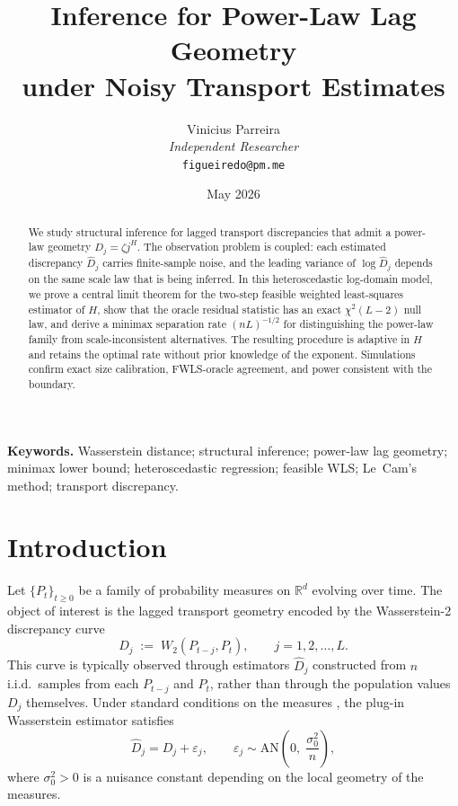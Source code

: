 \documentclass[10pt,a4paper,twocolumn]{article}
\title{\textbf{Inference for Power-Law Lag Geometry\\
under Noisy Transport Estimates}\\[0.5em]
}
\author{%
  Vinicius Parreira\hspace{0.18em}\orcidlink{0009-0005-0201-9308}\\[2pt]
  \small\textit{Independent Researcher}\\
  \small\texttt{figueiredo@pm.me}
}
\date{May 2026}
\newcommand{\R}{\mathbb{R}}
\newcommand{\Dhj}{\widehat{D}_j}
\begin{document}
\raggedbottom
\maketitle
\thispagestyle{empty}

\begin{abstract}
We study structural inference for lagged transport discrepancies that admit a
power-law geometry $D_j = \zeta j^H$.  The observation problem is coupled:
each estimated discrepancy $\Dhj$ carries finite-sample noise, and the
leading variance of $\log \Dhj$ depends on the same scale law that is being
inferred.  In this heteroscedastic log-domain model, we prove a central limit
theorem for the two-step feasible weighted least-squares estimator of $H$,
show that the oracle residual statistic has an exact $\chi^2(L-2)$ null law,
and derive a minimax separation rate $(nL)^{-1/2}$ for distinguishing the
power-law family from scale-inconsistent alternatives.  The resulting
procedure is adaptive in $H$ and retains the optimal rate without prior
knowledge of the exponent.  Simulations confirm exact size calibration,
FWLS-oracle agreement, and power consistent with the boundary.
\end{abstract}

\bigskip\noindent
\textbf{Keywords.} Wasserstein distance; structural inference; power-law lag
geometry; minimax lower bound; heteroscedastic regression; feasible WLS;
Le~Cam's method; transport discrepancy.

\section{Introduction}
\label{sec:intro}

Let $\{P_t\}_{t \geq 0}$ be a family of probability measures on
$\R^d$ evolving over time.  The object of interest is the lagged transport
geometry encoded by the Wasserstein-2 discrepancy curve
\[
    D_j \;:=\; W_2(P_{t-j}, P_t),\qquad j = 1, 2, \ldots, L.
\]
This curve is typically observed through estimators $\Dhj$ constructed from
$n$ i.i.d.\ samples from each $P_{t-j}$ and $P_t$, rather than through the
population values $D_j$ themselves.  Under standard conditions on the measures
\citep{FournierGuillin2015,GoldfeldEtAl2022,delBarrioEtAl2023}, the plug-in Wasserstein estimator
satisfies
\begin{equation}
    \Dhj = D_j + \varepsilon_j,\qquad
    \varepsilon_j \sim \mathrm{AN}\!\left(0,\; \frac{\sigma_0^2}{n}\right),
    \label{eq:obs-model}
\end{equation}
where $\sigma_0^2 > 0$ is a nuisance constant depending on the local
geometry of the measures.
\end{document}
